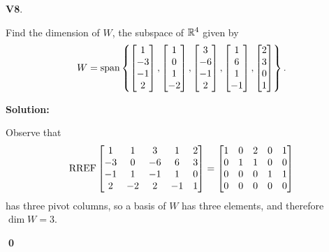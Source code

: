\documentclass{article}
\newenvironment{problem}[1]
{
  \begin{flushleft}
  \textbf{#1}.
  \ignorespaces
}
{
  \end{flushleft}
}
\newenvironment{solution}
{
  \ignorespaces
  \textbf{Solution:}
}
{
  \ignorespacesafterend
  \begin{flushright}
  {\bfseries \qed}
  \end{flushright}
}
\begin{document}
\begin{problem}{V8}
Find the dimension of \(W\), the subspace of \(\mathbb{R}^4\) given by
\[
  W = \operatorname{span} \left\{
  \begin{bmatrix} 1 \\ -3 \\ -1 \\ 2 \end{bmatrix} ,
  \begin{bmatrix} 1 \\ 0 \\ 1 \\ -2 \end{bmatrix} ,
  \begin{bmatrix} 3 \\ -6 \\ -1 \\ 2 \end{bmatrix} ,
  \begin{bmatrix} 1 \\ 6 \\ 1 \\ -1 \end{bmatrix} ,
  \begin{bmatrix} 2 \\ 3 \\ 0 \\ 1 \end{bmatrix}
  \right\} .
\]
\end{problem}
\begin{solution}
Observe that
\[ \operatorname{RREF}
    \begin{bmatrix}
    1 & 1 & 3 & 1 & 2 \\
    -3 & 0 & -6 & 6 & 3 \\
    -1 & 1 & -1 & 1 & 0 \\
    2 & -2 & 2 & -1 & 1
    \end{bmatrix} =
    \begin{bmatrix}
    1 & 0 & 2 & 0 & 1 \\
    0 & 1 & 1 & 0 & 0 \\
    0 & 0 & 0 & 1 & 1 \\
    0 & 0 & 0 & 0 & 0
    \end{bmatrix}
\]
has three pivot columns, so a basis of \(W\) has three elements, and therefore \(\dim W = 3\).
\end{solution}
\end{document}
